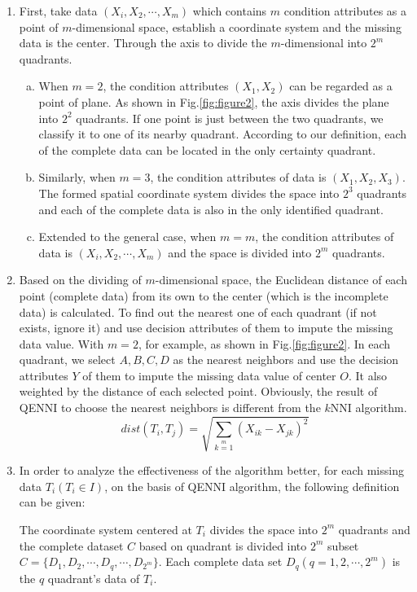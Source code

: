 \documentclass[print]{jicspack}
\begin{document}
\begin{enumerate}[(1)]
\item First, take data $(X_i, X_2, \cdots, X_m)$ which contains $m$ condition attributes as a point of $m$-dimensional space, establish a coordinate system and the missing data is the center. Through the axis to divide the $m$-dimensional into $2^m$ quadrants.
  \begin{enumerate}[a.]
  \item When $m = 2$, the condition attributes $(X_1, X_2)$ can be regarded as a point of plane. As shown in Fig.\ref{fig:figure2}, the axis divides the plane into $2^2$ quadrants. If one point is just between the two quadrants, we classify it to one of its nearby quadrant. According to our definition, each of the complete data can be located in the only certainty quadrant.
  \item Similarly, when $m = 3$, the condition attributes of data is $(X_1, X_2, X_3)$. The formed spatial coordinate system divides the space into $2^3$ quadrants and each of the complete data is also in the only identified quadrant.
  \item Extended to the general case, when $m = m$, the condition attributes of data is $(X_i, X_2, \cdots, X_m)$ and the space is divided into $2^m$ quadrants.
  \end{enumerate}
\item Based on the dividing of $m$-dimensional space, the Euclidean distance of each point (complete data) from its own to the center (which is the incomplete data) is calculated. To find out the nearest one of each quadrant (if not exists, ignore it) and use decision attributes of them to impute the missing data value. With $m = 2$, for example, as shown in Fig.\ref{fig:figure2}. In each quadrant,  we select $A, B, C, D$ as the nearest neighbors and use the decision attributes $Y$ of them to impute the missing data value of center $O$. It also weighted by the distance of each selected point. Obviously, the result of QENNI to choose the nearest neighbors is different from the $k$NNI algorithm.
\begin{equation}
\label{eq:1}
dist(T_i, T_j) =\sqrt{ \sum\limits_{k=1}\limits^{m} (X_{ik} - X_{jk})^2}
\end{equation}
\item In order to analyze the effectiveness of the algorithm better, for each missing data $T_i (T_i \in I)$, on the basis of QENNI algorithm,  the following definition can be given:
\begin{defn} The coordinate system centered at $T_i$ divides the space into $2^m$ quadrants and the complete dataset $C$ based on quadrant is divided into $2^m$ subset $C = \{D_1, D_2, \cdots, D_q, \cdots, D_{2^m}\}$. Each complete data set $D_q (q = 1, 2, \cdots, 2^m)$ is the $q$ quadrant's data of $T_i$. \end{defn}

\end{enumerate}
\end{document}
